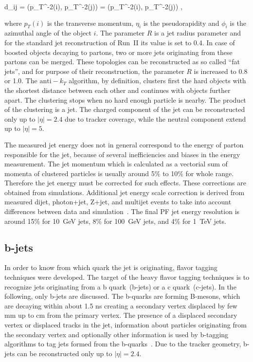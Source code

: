 {   
    d_{ij} = ({p_{T}}^{-2}(i), {p_{T}}^{-2}(j))  =  ({p_{T}}^{-2}(i), {p_{T}}^{-2}(j)) ,
}

where $p_{T}(i)$ is the transverse momentum, $\eta_{i}$ is the pseudorapidity and $\phi_{i}$ is the azimuthal angle of the object $i$. The parameter $R$ is a jet radius parameter and for the standard jet reconstruction of Run~II its value is set to 0.4. In case of boosted objects decaying to partons, two or more jets originating from these partons can be merged. These topologies can be reconstructed as so called ``fat jets'', and for purpose of their reconstruction, the parameter $R$ is increased to 0.8 or 1.0. The $\mathrm{anti-}k_{T}$ algorithm, by definition, clusters first the hard objects with the shortest distance between each other and continues with objects further apart. The clustering stops when no hard enough particle is nearby. The product of the clustering is a jet. The charged component of the jet can be reconstructed only up to $|\eta|=2.4$ due to tracker coverage, while the neutral component extend up to  $|\eta|=5$.

The measured jet energy does not in general correspond to the energy of parton responsible for the jet, because of several inefficiencies and biases in the energy measurement. The jet momentum which is calculated as a vectorial sum of momenta of clustered particles is usually around 5\% to 10\% for whole \pt range. Therefore the jet energy must be corrected for such effects. These corrections are obtained from simulations. Additional jet energy scale correction is derived from measured dijet, photon+jet, Z+jet, and multijet events to take into account differences between data and simulation~\cite{Khachatryan:2016kdb}. The final PF jet energy resolution is around 15\% for 10~GeV jets, 8\% for 100~GeV jets, and 4\% for 1~TeV jets. 

\subsection{b-jets}

In order to know from which quark the jet is originating, flavor tagging techniques were developed. The target of the heavy flavor tagging techniques is to recognize jets originating from a b quark~(b-jets) or a c quark~(c-jets). In the following, only b-jets are discussed. The b-quarks are forming B-mesons, which are decaying within about 1.5 ns creating a secondary vertex displaced by few mm up to cm from the primary vertex. The presence of a displaced secondary vertex or displaced tracks in the jet, information about particles originating from the secondary vertex and optionally other information is used by b-tagging algorithms to tag jets formed from the b-quarks~\cite{Sirunyan:2017ezt}. Due to the tracker geometry, b-jets can be reconstructed only up to $|\eta|=2.4$.


